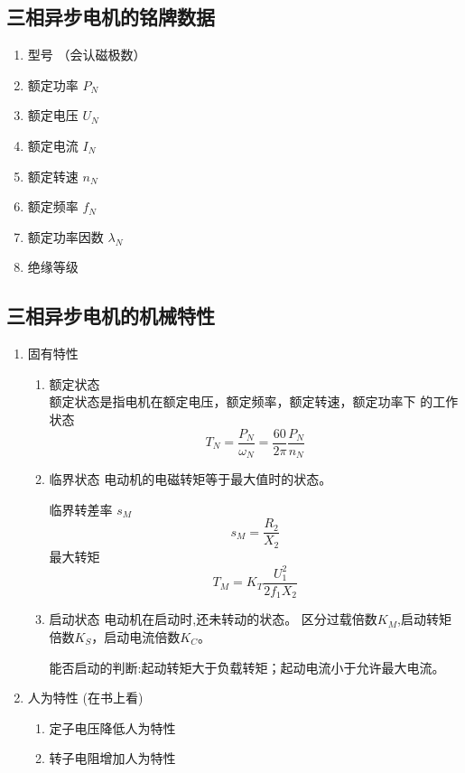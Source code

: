 \subsection{三相异步电机的铭牌数据}

\begin{enumerate}
    \item 型号 （会认磁极数）
    \item 额定功率 $P_N$
    \item 额定电压 $U_N$
    \item 额定电流 $I_N$
    \item 额定转速 $n_N$
    \item 额定频率 $f_N$
    \item 额定功率因数 $\lambda_N$
    \item 绝缘等级
\end{enumerate}

\subsection{三相异步电机的机械特性}

\begin{enumerate}
    \item 固有特性
    \begin{enumerate}
        \item 额定状态 \\
        额定状态是指电机在额定电压，额定频率，额定转速，额定功率下
        的工作状态
        \begin{equation}
            T_N=\frac{P_N}{\omega_N}=\frac{60}{2\pi}\frac{P_N}{n_N}
        \end{equation}
        \item 临界状态
        电动机的电磁转矩等于最大值时的状态。
        
        临界转差率 $s_{M}$
        \begin{equation}
            s_{M}=\frac{R_2}{X_2}
        \end{equation}
        最大转矩
        \begin{equation}
            T_{M}=K_T\frac{U_1^2}{2f_1X_2}
        \end{equation}
        \item 启动状态
        电动机在启动时,还未转动的状态。
        区分过载倍数$K_M$,启动转矩倍数$K_S$，启动电流倍数$K_C$。

        能否启动的判断:起动转矩大于负载转矩；起动电流小于允许最大电流。

    \end{enumerate}
    \item 人为特性 (在书上看)
    \begin{enumerate}
        \item 定子电压降低人为特性
        \item 转子电阻增加人为特性
    \end{enumerate}
\end{enumerate}

